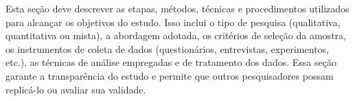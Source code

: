 Esta seção deve descrever as etapas, métodos, técnicas e procedimentos
utilizados para alcançar os objetivos do estudo. Isso inclui o tipo de pesquisa
(qualitativa, quantitativa ou mista), a abordagem adotada, os critérios de
seleção da amostra, os instrumentos de coleta de dados (questionários,
entrevistas, experimentos, etc.), as técnicas de análise empregadas e de
tratamento dos dados. Essa seção garante a transparência do estudo e permite
que outros pesquisadores possam replicá-lo ou avaliar sua validade.

